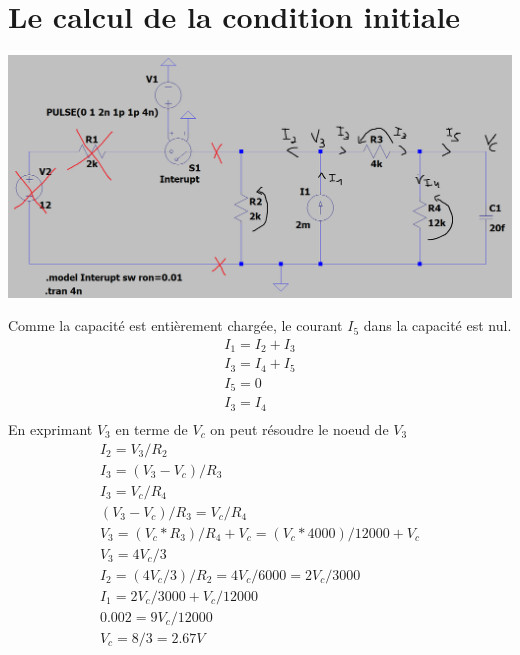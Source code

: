 \documentclass{homeworg}
\begin{document}
\section{Le calcul de la condition initiale}
    \begin{center}
        \includegraphics[scale=0.35]{Vinit.png}
    \end{center}
    Comme la capacité est entièrement chargée, le courant $I_5$ dans la capacité est nul.
    \begin{align}
        I_1 = I_2 + I_3\\
        I_3 = I_4 + I_5\\
        I_5 = 0\\
        I_3 = I_4\\
    \end{align}
    En exprimant $V_3$ en terme de $V_c$ on peut résoudre le noeud de $V_3$
    \begin{align}
        I_2 = V_3 / R_2\\
        I_3 = (V_3 - V_c) / R_3\\
        I_3 = V_c / R_4\\
        (V_3 - V_c) / R_3 = V_c / R_4\\
        V_3 = (V_c * R_3) / R_4 + V_c = (V_c * 4000) / 12000 + V_c\\
        V_3 = 4V_c / 3\\
        I_2 = (4V_c / 3) / R_2 = 4V_c / 6000 = 2V_c / 3000\\
        I_1 = 2V_c / 3000 + V_c / 12000\\
        0.002 = 9V_c / 12000\\
        V_c = 8/3 = 2.67V
    \end{align}

\newpage
\end{document}
